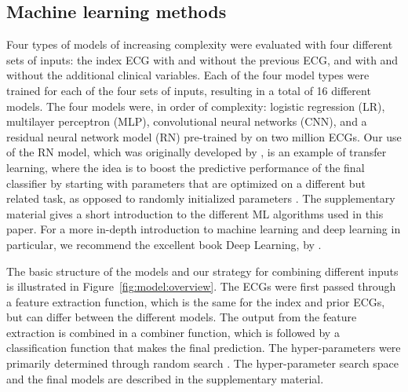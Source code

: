 \documentclass[preprint]{elsarticle}
\begin{document}
\subsection{Machine learning methods}
Four types of models of increasing complexity were evaluated with four different sets of inputs: the index ECG with and without the previous ECG, and with and without the additional clinical variables. Each of the four model types were trained for each of the four sets of inputs, resulting in a total of 16 different models. The four models were, in order of complexity: logistic regression (LR), multilayer perceptron (MLP), convolutional neural networks (CNN), and a residual neural network model (RN) pre-trained by \citet{ribeiro2020} on two million ECGs. Our use of the RN model, which was originally developed by \citet{he2016}, is an example of transfer learning, where the idea is to boost the predictive performance of the final classifier by starting with parameters that are optimized on a different but related task, as opposed to randomly initialized parameters \citep{weiss2016}. The supplementary material gives a short introduction to the different ML algorithms used in this paper. For a more in-depth introduction to machine learning and deep learning in particular, we recommend the excellent book Deep Learning, by \citet{goodfellow2016}.

The basic structure of the models and our strategy for combining different inputs is illustrated in Figure~\ref{fig:model:overview}. The ECGs were first passed through a feature extraction function, which is the same for the index and prior ECGs, but can differ between the different models. The output from the feature extraction is combined in a combiner function, which is followed by a classification function that makes the final prediction. The hyper-parameters were primarily determined through random search \citep{bergstra2012}. The hyper-parameter search space and the final models are described in the supplementary material.
\end{document}

